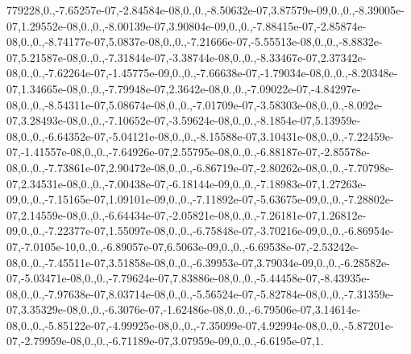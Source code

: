 {779228,0.,-\/7.\-65257e-\/07,-\/2.\-84584e-\/08,0.,0.,-\/8.\-50632e-\/07,3.\-87579e-\/09,0.,0.,-\/8.\-39005e-\/07,1.\-29552e-\/08,0.,0.,-\/8.\-00139e-\/07,3.\-90804e-\/09,0.,0.,-\/7.\-88415e-\/07,-\/2.\-85874e-\/08,0.,0.,-\/8.\-74177e-\/07,5.\-0837e-\/08,0.,0.,-\/7.\-21666e-\/07,-\/5.\-55513e-\/08,0.,0.,-\/8.\-8832e-\/07,5.\-21587e-\/08,0.,0.,-\/7.\-31844e-\/07,-\/3.\-38744e-\/08,0.,0.,-\/8.\-33467e-\/07,2.\-37342e-\/08,0.,0.,-\/7.\-62264e-\/07,-\/1.\-45775e-\/09,0.,0.,-\/7.\-66638e-\/07,-\/1.\-79034e-\/08,0.,0.,-\/8.\-20348e-\/07,1.\-34665e-\/08,0.,0.,-\/7.\-79948e-\/07,2.\-3642e-\/08,0.,0.,-\/7.\-09022e-\/07,-\/4.\-84297e-\/08,0.,0.,-\/8.\-54311e-\/07,5.\-08674e-\/08,0.,0.,-\/7.\-01709e-\/07,-\/3.\-58303e-\/08,0.,0.,-\/8.\-092e-\/07,3.\-28493e-\/08,0.,0.,-\/7.\-10652e-\/07,-\/3.\-59624e-\/08,0.,0.,-\/8.\-1854e-\/07,5.\-13959e-\/08,0.,0.,-\/6.\-64352e-\/07,-\/5.\-04121e-\/08,0.,0.,-\/8.\-15588e-\/07,3.\-10431e-\/08,0.,0.,-\/7.\-22459e-\/07,-\/1.\-41557e-\/08,0.,0.,-\/7.\-64926e-\/07,2.\-55795e-\/08,0.,0.,-\/6.\-88187e-\/07,-\/2.\-85578e-\/08,0.,0.,-\/7.\-73861e-\/07,2.\-90472e-\/08,0.,0.,-\/6.\-86719e-\/07,-\/2.\-80262e-\/08,0.,0.,-\/7.\-70798e-\/07,2.\-34531e-\/08,0.,0.,-\/7.\-00438e-\/07,-\/6.\-18144e-\/09,0.,0.,-\/7.\-18983e-\/07,1.\-27263e-\/09,0.,0.,-\/7.\-15165e-\/07,1.\-09101e-\/09,0.,0.,-\/7.\-11892e-\/07,-\/5.\-63675e-\/09,0.,0.,-\/7.\-28802e-\/07,2.\-14559e-\/08,0.,0.,-\/6.\-64434e-\/07,-\/2.\-05821e-\/08,0.,0.,-\/7.\-26181e-\/07,1.\-26812e-\/09,0.,0.,-\/7.\-22377e-\/07,1.\-55097e-\/08,0.,0.,-\/6.\-75848e-\/07,-\/3.\-70216e-\/09,0.,0.,-\/6.\-86954e-\/07,-\/7.\-0105e-\/10,0.,0.,-\/6.\-89057e-\/07,6.\-5063e-\/09,0.,0.,-\/6.\-69538e-\/07,-\/2.\-53242e-\/08,0.,0.,-\/7.\-45511e-\/07,3.\-51858e-\/08,0.,0.,-\/6.\-39953e-\/07,3.\-79034e-\/09,0.,0.,-\/6.\-28582e-\/07,-\/5.\-03471e-\/08,0.,0.,-\/7.\-79624e-\/07,7.\-83886e-\/08,0.,0.,-\/5.\-44458e-\/07,-\/8.\-43935e-\/08,0.,0.,-\/7.\-97638e-\/07,8.\-03714e-\/08,0.,0.,-\/5.\-56524e-\/07,-\/5.\-82784e-\/08,0.,0.,-\/7.\-31359e-\/07,3.\-35329e-\/08,0.,0.,-\/6.\-3076e-\/07,-\/1.\-62486e-\/08,0.,0.,-\/6.\-79506e-\/07,3.\-14614e-\/08,0.,0.,-\/5.\-85122e-\/07,-\/4.\-99925e-\/08,0.,0.,-\/7.\-35099e-\/07,4.\-92994e-\/08,0.,0.,-\/5.\-87201e-\/07,-\/2.\-79959e-\/08,0.,0.,-\/6.\-71189e-\/07,3.\-07959e-\/09,0.,0.,-\/6.\-6195e-\/07,1.}
